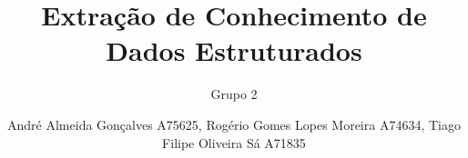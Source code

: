 \title{Extração de Conhecimento de Dados Estruturados}

\author{
André Almeida Gonçalves A75625,
Rogério Gomes Lopes Moreira A74634,
Tiago Filipe Oliveira Sá A71835}

\subtitle{Grupo 2}

\maketitle